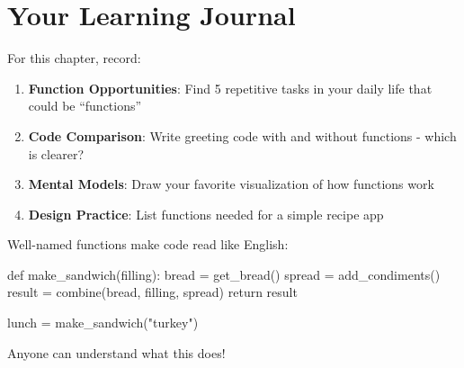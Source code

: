 \documentclass[
  letterpaper,
  DIV=11,
  numbers=noendperiod,
  oneside]{scrreprt}
\newenvironment{Shaded}{}{}
\newcommand{\ControlFlowTok}[1]{\textcolor[rgb]{0.84,0.23,0.29}{#1}}
\newcommand{\KeywordTok}[1]{\textcolor[rgb]{0.84,0.23,0.29}{#1}}
\newcommand{\NormalTok}[1]{\textcolor[rgb]{0.14,0.16,0.18}{#1}}
\newcommand{\OperatorTok}[1]{\textcolor[rgb]{0.14,0.16,0.18}{#1}}
\newcommand{\StringTok}[1]{\textcolor[rgb]{0.01,0.18,0.38}{#1}}
\providecommand{\tightlist}{%
  \setlength{\itemsep}{0pt}\setlength{\parskip}{0pt}}\usepackage{longtable,booktabs,array}
\begin{document}
\section{Your Learning Journal}\label{your-learning-journal-6}

For this chapter, record:

\begin{enumerate}
\def\labelenumi{\arabic{enumi}.}
\tightlist
\item
  \textbf{Function Opportunities}: Find 5 repetitive tasks in your daily
  life that could be ``functions''
\item
  \textbf{Code Comparison}: Write greeting code with and without
  functions - which is clearer?
\item
  \textbf{Mental Models}: Draw your favorite visualization of how
  functions work
\item
  \textbf{Design Practice}: List functions needed for a simple recipe
  app
\end{enumerate}

\begin{tcolorbox}[enhanced jigsaw, opacityback=0, colback=white, colframe=quarto-callout-tip-color-frame, breakable, titlerule=0mm, coltitle=black, rightrule=.15mm, colbacktitle=quarto-callout-tip-color!10!white, left=2mm, bottomtitle=1mm, bottomrule=.15mm, title=\textcolor{quarto-callout-tip-color}{\faLightbulb}\hspace{0.5em}{The Power of Good Names}, opacitybacktitle=0.6, toptitle=1mm, leftrule=.75mm, arc=.35mm, toprule=.15mm]

Well-named functions make code read like English:

\begin{Shaded}
\begin{Highlighting}[]
\KeywordTok{def}\NormalTok{ make\_sandwich(filling):}
\NormalTok{    bread }\OperatorTok{=}\NormalTok{ get\_bread()}
\NormalTok{    spread }\OperatorTok{=}\NormalTok{ add\_condiments()}
\NormalTok{    result }\OperatorTok{=}\NormalTok{ combine(bread, filling, spread)}
    \ControlFlowTok{return}\NormalTok{ result}

\NormalTok{lunch }\OperatorTok{=}\NormalTok{ make\_sandwich(}\StringTok{"turkey"}\NormalTok{)}
\end{Highlighting}
\end{Shaded}

Anyone can understand what this does!

\end{tcolorbox}
\end{document}
